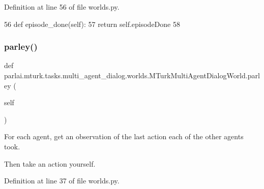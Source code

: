 Definition at line 56 of file worlds.\+py.


\begin{DoxyCode}
56     \textcolor{keyword}{def }episode\_done(self):
57         \textcolor{keywordflow}{return} self.episodeDone
58 
\end{DoxyCode}
\mbox{\label{classparlai_1_1mturk_1_1tasks_1_1multi__agent__dialog_1_1worlds_1_1MTurkMultiAgentDialogWorld_a68fbe9035c66bb74a1782be884860a7a}} 
\subsubsection{\texorpdfstring{parley()}{parley()}}
{\footnotesize\ttfamily def parlai.\+mturk.\+tasks.\+multi\+\_\+agent\+\_\+dialog.\+worlds.\+M\+Turk\+Multi\+Agent\+Dialog\+World.\+parley (\begin{DoxyParamCaption}\item[{}]{self }\end{DoxyParamCaption})}

\begin{DoxyVerb}For each agent, get an observation of the last action each of the other agents
took.

Then take an action yourself.
\end{DoxyVerb}
 

Definition at line 37 of file worlds.\+py.


